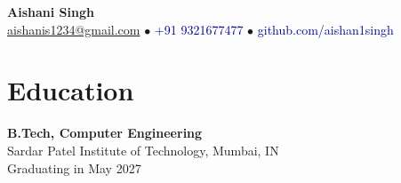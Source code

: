 \documentclass{article}
\begin{document}
\begin{center}
    \textbf{\Huge Aishani Singh} \\
    \vspace{5pt}
    \small \textcolor{darkblue}{\href{mailto:aishanis1234@gmail.com}{aishanis1234@gmail.com}} $\bullet$ \textcolor{darkblue}{+91 9321677477} $\bullet$ \textcolor{darkblue}{github.com/aishan1singh}
\end{center}

\section*{Education}
\textbf{B.Tech, Computer Engineering} \\
Sardar Patel Institute of Technology, Mumbai, IN \\
Graduating in May 2027
\end{document}
